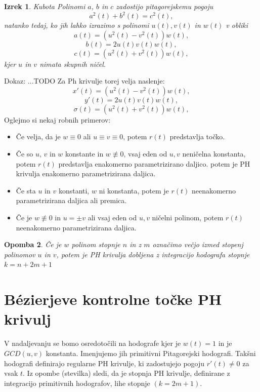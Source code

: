 \documentclass[12pt]{article}
\newtheorem{Izrek}{{\sc Izrek}}[section]
\newtheorem{Opomba}[Izrek]{{\sc Opomba}}
\begin{document}
\begin{Izrek}{Kubota}\newline
	Polinomi $a$, $b$ in $c$ zadostijo pitagorejskemu pogoju
	$$a^2(t) + b^2(t) = c^2(t),$$
	natanko tedaj, ko jih lahko izrazimo s polinomi $u(t), v(t)$ in $w(t)$ v obliki
	$$a(t) = (u^2(t) - v^2(t))w(t),$$
	$$b(t) = 2u(t)v(t)w(t),$$
	$$c(t) = (u^2(t) + v^2(t))w(t),$$
	kjer $u$ in $v$ nimata skupnih ničel.
\end{Izrek}
Dokaz: ...TODO\newline
Za Ph krivulje torej velja naslenje:
$$x'(t) = (u^2(t) - v^2(t))w(t),$$
$$y'(t) = 2u(t)v(t)w(t),$$
$$\sigma(t) = (u^2(t) + v^2(t))w(t),$$
Oglejmo si nekaj robnih primerov:
\begin{itemize}
	\item Če velja, da je $w\equiv0$ ali $u\equiv v \equiv 0$, potem $r(t)$ predstavlja točko.
	\item Če so $u$, $v$ in $w$ konstante in $w \not\equiv 0$, vsaj eden od $u, v$ neničelna konstanta, potem $r(t)$ predstavlja enakomerno parametrizirano daljico.
	potem je PH krivulja enakomerno parametrizirana daljica.
	\item Če sta $u$ in $v$ konstanti, $w$  ni konstanta, potem je  $r(t)$ neenakomerno parametrizirana daljica ali premica.
	\item Če je $w \not\equiv 0$ in $u = \pm v$ ali vsaj eden od $u, v$ ničelni polinom, 
	potem $r(t)$ neenakomerno parametrizirana daljica.
\end{itemize}
\begin{Opomba}
	Če je $w$ polinom stopnje $n$ in z $m$ označimo večjo izmed stopenj polinomov $u$ in $v$, 
potem je PH krivulja dobljena z integracijo hodografa stopnje $k = n + 2m + 1$
\end{Opomba}

\section{B\'ezierjeve kontrolne točke PH krivulj}
V nadaljevanju se bomo osredotočili na hodografe kjer je $w(t) = 1$ in je $GCD(u,v)$ konstanta.
Imenjujemo jih primitivni Pitagorejski hodografi. 
Takšni hodografi definirajo regularne PH krivulje, ki zadostujejo pogoju $r'(t) \neq 0$ za vsak $t$. 
Iz opombe (stevilka) sledi, da je stopnja PH krivulje, definirane z integracijo
primitivnih hodografov, lihe stopnje $(k = 2m + 1)$.
\end{document}
